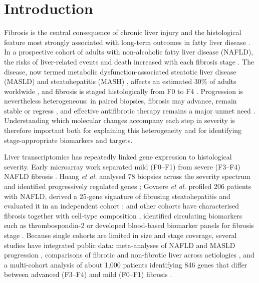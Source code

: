 \documentclass[11pt,a4paper]{article}
\begin{document}
\section*{Introduction}
Fibrosis is the central consequence of chronic liver injury and the histological feature most strongly associated with long-term outcomes in fatty liver disease \cite{angulo2015,taylor2020}. In a prospective cohort of adults with non-alcoholic fatty liver disease (NAFLD), the risks of liver-related events and death increased with each fibrosis stage \cite{sanyal2021}. The disease, now termed metabolic dysfunction-associated steatotic liver disease (MASLD) and steatohepatitis (MASH) \cite{rinella2023}, affects an estimated 30\% of adults worldwide \cite{younossi2023}, and fibrosis is staged histologically from F0 to F4 \cite{kleiner2005}. Progression is nevertheless heterogeneous: in paired biopsies, fibrosis may advance, remain stable or regress \cite{singh2015}, and effective antifibrotic therapy remains a major unmet need \cite{friedman2022}. Understanding which molecular changes accompany each step in severity is therefore important both for explaining this heterogeneity and for identifying stage-appropriate biomarkers and targets.

Liver transcriptomics has repeatedly linked gene expression to histological severity. Early microarray work separated mild (F0--F1) from severe (F3--F4) NAFLD fibrosis \cite{moylan2014}. Hoang \textit{et al.} analysed 78 biopsies across the severity spectrum and identified progressively regulated genes \cite{hoang2019}; Govaere \textit{et al.} profiled 206 patients with NAFLD, derived a 25-gene signature of fibrosing steatohepatitis and evaluated it in an independent cohort \cite{govaere2020}; and other cohorts have characterised fibrosis together with cell-type composition \cite{pantano2021}, identified circulating biomarkers such as thrombospondin-2 \cite{kozumi2021} or developed blood-based biomarker panels for fibrosis stage \cite{verschuren2024}. Because single cohorts are limited in size and stage coverage, several studies have integrated public data: meta-analyses of NAFLD and MASLD progression \cite{ryaboshapkina2017,piras2024}, comparisons of fibrotic and non-fibrotic liver across aetiologies \cite{yang2026}, and a multi-cohort analysis of about 1,000 patients identifying 846 genes that differ between advanced (F3--F4) and mild (F0--F1) fibrosis \cite{maiers2026}.
\end{document}
